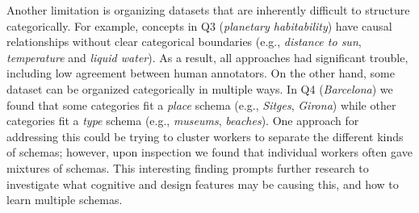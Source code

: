 
Another limitation is organizing datasets that are inherently difficult to structure categorically. For example, 
concepts in Q3 (\emph{planetary habitability}) have causal relationships without
clear categorical boundaries (e.g., \emph{distance to sun}, \emph{temperature} and \emph{liquid water}).
As a result, all approaches had significant trouble,
including low agreement between human annotators. 
On the other hand, some dataset can be organized categorically in multiple ways.
In Q4 (\emph{Barcelona}) we found that some categories fit a \emph{place}
schema (e.g., \emph{Sitges}, \emph{Girona}) while other categories fit a \emph{type}
schema (e.g., \emph{museums}, \emph{beaches}).
One approach for addressing this could be trying to cluster workers to separate the different kinds of schemas; however, upon inspection we found that individual
workers often gave mixtures of schemas. This interesting finding prompts further research to investigate what cognitive and design features may be causing this, and how to learn multiple schemas. 




